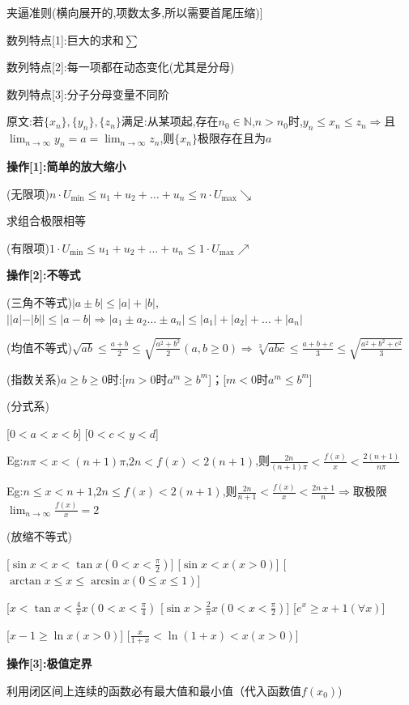 \documentclass[11pt,a4paper,UTF8]{ctexart}
\begin{document}
\begin{thmbox}[[3]夹逼准则(横向展开的,项数太多,所以需要首尾压缩)]

数列特点[1]:巨大的求和$\sum$

数列特点[2]:每一项都在动态变化(尤其是分母)

数列特点[3]:分子分母变量不同阶

原文:若$\{x_n\}, \{y_n\}, \{z_n\}$满足:从某项起,存在$n_0 \in \mathbb{N}$,$n > n_0$时,$y_n \le x_n \le z_n \Rightarrow$且$\lim_{n \to \infty} y_n = a = \lim_{n \to \infty} z_n$,则$\{x_n\}$极限存在且为$a$

\textbf{操作[1]:简单的放大缩小}

(无限项)$n \cdot U_{\min} \le u_1 + u_2 + \dots + u_n \le n \cdot U_{\max} \searrow$

					    求组合极限相等

(有限项)$1 \cdot U_{\min} \le u_1 + u_2 + \dots + u_n \le 1 \cdot U_{\max} \nearrow$

\textbf{操作[2]:不等式}

(三角不等式)$|a \pm b| \le |a| + |b|$,$||a| - |b|| \le |a-b| \Rightarrow |a_1 \pm a_2 \dots \pm a_n| \le |a_1| + |a_2| + \dots + |a_n|$

(均值不等式)$\sqrt{ab} \le \frac{a+b}{2} \le \sqrt{\frac{a^2+b^2}{2}} (a,b \ge 0) \Rightarrow \sqrt[3]{abc} \le \frac{a+b+c}{3} \le \sqrt{\frac{a^2+b^2+c^2}{3}}$

(指数关系)$a \ge b \ge 0$时:[$m > 0$时$a^m \ge b^m$]；[$m < 0$时$a^m \le b^m$]

(分式系) 

  [$0 < a < x < b$]		    [$0 < c < y < d$]

  Eg:$n\pi < x <(n+1)\pi$,$2n < f(x) < 2(n+1)$,则$\frac{2n}{(n+1)\pi} < \frac{f(x)}{x} < \frac{2(n+1)}{n\pi}$

  Eg:$n \le x < n+1$,$2n \le f(x) < 2(n+1)$,则$\frac{2n}{n+1} < \frac{f(x)}{x} < \frac{2n+1}{n} \Rightarrow$取极限$\lim_{n \to \infty} \frac{f(x)}{x} = 2$

(放缩不等式)

  [$\sin x < x < \tan x (0 < x < \frac{\pi}{2})$]	[$\sin x < x (x > 0)$]	[$\arctan x \le x \le \arcsin x (0 \le x \le 1)$]

  [$x < \tan x < \frac{4}{\pi}x (0 < x < \frac{\pi}{4})$	  [$\sin x > \frac{2}{\pi}x (0 < x < \frac{\pi}{2})$]  [$e^x \ge x+1 (\forall x)$]

  [$x-1 \ge \ln x (x>0)$]	        [$\frac{x}{1+x} < \ln(1+x) < x (x>0)$]

\textbf{操作[3]:极值定界}

利用闭区间上连续的函数必有最大值和最小值（代入函数值$f(x_0)$)

\end{thmbox}
\end{document}
